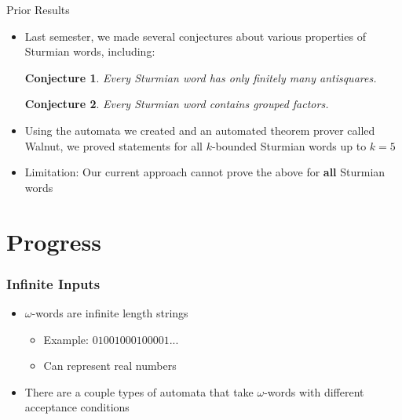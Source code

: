 \documentclass[leqno,presentation]{beamer}
\newtheorem*{conjecture}{Conjecture}
\begin{document}
\begin{frame}{Prior Results}
    \begin{itemize}
        \item Last semester, we made several conjectures about various properties of Sturmian words, including:
        
            \begin{conjecture}\label{conj:antisq}
                Every Sturmian word has only finitely many antisquares.
            \end{conjecture}
                        
            \begin{conjecture}\label{conj:grouped}
                Every Sturmian word contains grouped factors.
            \end{conjecture}
        
        \item Using the automata we created and an automated theorem prover called Walnut, we proved statements for all $k$-bounded Sturmian words up to $k = 5$
        
        \item Limitation: Our current approach cannot prove the above for \textbf{all} Sturmian words
    \end{itemize}
\end{frame}

\section{Progress}

\begin{frame}
  \frametitle{Infinite Inputs}
  \begin{itemize}
      \item $\omega$-words are infinite length strings
      \begin{itemize}
          \item Example: $01001000100001...$
          \item Can represent real numbers
      \end{itemize}
      \item There are a couple types of automata that take $\omega$-words with different acceptance conditions
  \end{itemize}
\end{frame}
\end{document}

